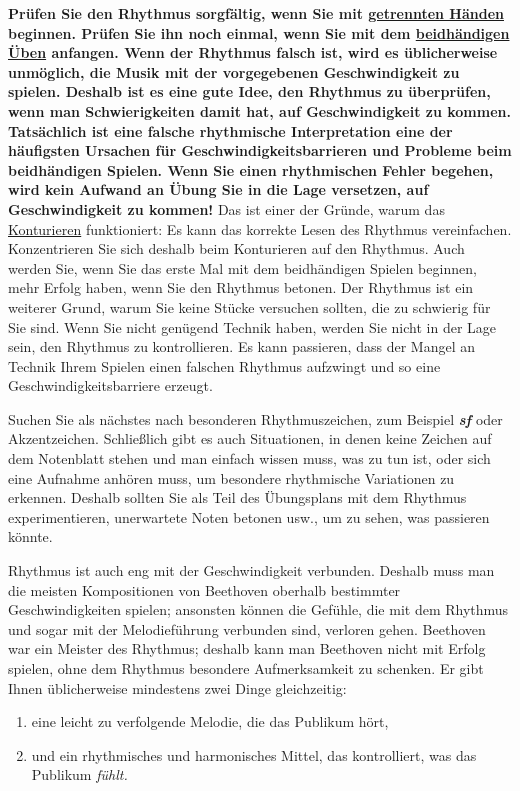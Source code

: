 \textbf{Prüfen Sie den Rhythmus sorgfältig, wenn Sie mit \hyperref[c1ii7]{getrennten Händen} beginnen.
Prüfen Sie ihn noch einmal, wenn Sie mit dem \hyperref[c1ii25]{beidhändigen Üben} anfangen.
Wenn der Rhythmus falsch ist, wird es üblicherweise unmöglich, die Musik  mit der vorgegebenen Geschwindigkeit zu spielen.
Deshalb ist es eine gute Idee, den Rhythmus zu überprüfen, wenn man Schwierigkeiten damit hat, auf Geschwindigkeit zu kommen.
Tatsächlich ist eine falsche rhythmische Interpretation eine der häufigsten Ursachen für Geschwindigkeitsbarrieren und Probleme beim beidhändigen Spielen.
Wenn Sie einen rhythmischen Fehler begehen, wird kein Aufwand an Übung Sie in die Lage versetzen, auf Geschwindigkeit zu kommen!}
Das ist einer der Gründe, warum das \hyperref[c1iii8]{Konturieren} funktioniert: Es kann das korrekte Lesen des Rhythmus vereinfachen.
Konzentrieren Sie sich deshalb beim Konturieren auf den Rhythmus.
Auch werden Sie, wenn Sie das erste Mal mit dem beidhändigen Spielen beginnen, mehr Erfolg haben, wenn Sie den Rhythmus betonen.
Der Rhythmus ist ein weiterer Grund, warum Sie keine Stücke versuchen sollten, die zu schwierig für Sie sind.
Wenn Sie nicht genügend Technik haben, werden Sie nicht in der Lage sein, den Rhythmus zu kontrollieren.
Es kann passieren, dass der Mangel an Technik Ihrem Spielen einen falschen Rhythmus aufzwingt und so eine Geschwindigkeitsbarriere erzeugt.

Suchen Sie als nächstes nach besonderen Rhythmuszeichen, zum Beispiel \textit{\textbf{sf}} oder Akzentzeichen.
Schließlich gibt es auch Situationen, in denen keine Zeichen auf dem Notenblatt stehen und man einfach wissen muss, was zu tun ist, oder sich eine Aufnahme anhören muss, um besondere rhythmische Variationen zu erkennen.
Deshalb sollten Sie als Teil des Übungsplans mit dem Rhythmus experimentieren, unerwartete Noten betonen usw., um zu sehen, was passieren könnte.

Rhythmus ist auch eng mit der Geschwindigkeit verbunden.
Deshalb muss man die meisten Kompositionen von Beethoven oberhalb bestimmter Geschwindigkeiten spielen; ansonsten können die Gefühle, die mit dem Rhythmus und sogar mit der Melodieführung verbunden sind, verloren gehen.
Beethoven war ein Meister des Rhythmus; deshalb kann man Beethoven nicht mit Erfolg spielen, ohne dem Rhythmus besondere Aufmerksamkeit zu schenken.
Er gibt Ihnen üblicherweise mindestens zwei Dinge gleichzeitig:

\begin{enumerate}[label={\roman*.}] 
\item eine leicht zu verfolgende Melodie, die das Publikum hört,
\item und ein rhythmisches und harmonisches Mittel, das kontrolliert, was das Publikum \textit{fühlt.}
\end{enumerate}

